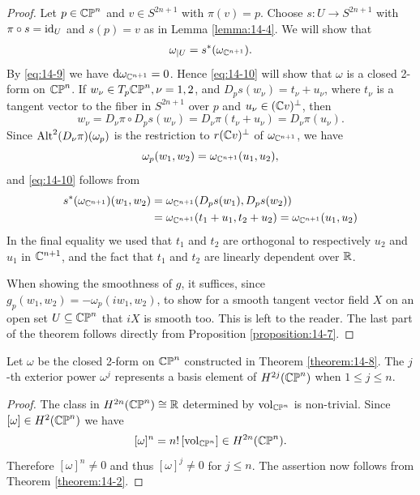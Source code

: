\begin{proof}
  Let $p\in\mathbb{CP}^n$ and $v\in S^{2n+1}$ with $\pi(v)=p$. Choose $s:U\to S^{2n+1}$ with 
  $\pi\circ s =\operatorname{id}_U$ and $s(p)=v$ as in Lemma \ref{lemma:14-4}. We will show that 
  \begin{align}\label{eq:14-10}
    \omega_{|U} = s^*(\omega_{{\mathbb{C}}^{n+1}}).
  \end{align}
  By \eqref{eq:14-9} we have $\dd\omega_{\CC^{n+1}} = 0$. Hence \eqref{eq:14-10} will show that $\omega$ 
  is a closed 2-form on $\mathbb{CP}^n$. If $w_\nu\in T_p\mathbb{CP}^n, \nu=1, 2$, and $D_ps(w_\nu)=t_\nu+u_\nu$,
  where $t_\nu$ is a tangent vector to the fiber in $S^{2n+1}$ over $p$ and $u_\nu\in ({\mathbb{C}} v)^\perp$, then 
  \[
    w_\nu = D_\nu\pi\circ D_ps(w_\nu) = D_\nu\pi(t_\nu + u_\nu) = D_\nu\pi(u_\nu).
  \]
  Since $\operatorname{Alt}^2(D_\nu\pi)(\omega_p)$ is the restriction to $r({\mathbb{C}} v)^\perp$ of $\omega_{{\mathbb{C}}^{n+1}}$, we have 
  \[
    \omega_p(w_1, w_2) = \omega_{{\mathbb{C}}^{n+1}}(u_1, u_2),
  \]
  and \eqref{eq:14-10} follows from 
  \begin{align*}
    s^*(\omega_{{\mathbb{C}}^{n+1}})(w_1, w_2) 
    & = \omega_{{\mathbb{C}}^{n+1}}(D_ps(w_1), D_ps(w_2)) \\
    & = \omega_{{\mathbb{C}}^{n+1}}(t_1 + u_1, t_2 + u_2)
      = \omega_{{\mathbb{C}}^{n+1}}(u_1, u_2)
  \end{align*}
  In the final equality we used that $t_1$ and $t_2$ are orthogonal to respectively $u_2$ and
  $u_1$ in ${\mathbb{C}}^{n+1}$, and the fact that $t_1$ and $t_2$ are linearly dependent over ${\mathbb{R}}$.

  When showing the smoothness of $g$, it suffices, since $g_p(w_1, w_2) = -\omega_p(iw_1, w_2)$,
  to show for a smooth tangent vector field $X$ on an open set $U\subseteq \mathbb{CP}^n$ that $iX$
  is smooth too. This is left to the reader. The last part of the theorem follows
  directly from Proposition \ref{proposition:14-7}.
\end{proof}

\begin{corollary}\label{corollary:14-9}
  Let $\omega$ be the closed 2-form on $\mathbb{CP}^n$ constructed in Theorem \ref{theorem:14-8}. The $j$-th 
  exterior power $\omega^j$ represents a basis element of $H^{2j}(\mathbb{CP}^n)$ when $1\le j\le n$.
\end{corollary}

\begin{proof}
  The class in $H^{2n}(\mathbb{CP}^n)\cong{\ensuremath{\mathbb{R}}}$ determined by $\mathrm{vol}_{\mathbb{CP}^n}$ is non-trivial. 
  Since $[\omega]\in H^2(\mathbb{CP}^n)$ we have
  \[
    [\omega]^n = n!\,[\mathrm{vol}_{\mathbb{CP}^n}]\in H^{2n}(\mathbb{CP}^n).
  \]
  Therefore $[\omega]^n\neq 0$ and thus $[\omega]^j\neq 0$ for $j\le n$. The assertion now follows 
  from Theorem \ref{theorem:14-2}. 
\end{proof}

